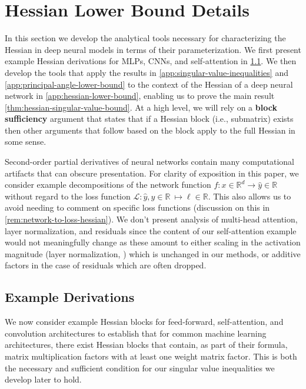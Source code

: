 \documentclass{article}
\theoremstyle{plain}
\theoremstyle{definition}
\theoremstyle{remark}
\begin{document}
\section{Hessian Lower Bound Details}
\label{app:hessian-lower-bound-details}

In this section we develop the analytical tools necessary for characterizing the Hessian in deep neural models in terms of their parameterization. We first present example Hessian derivations for MLPs, CNNs, and self-attention in \cref{app:example-hessian-derivations}. We then develop the tools that apply the results in \cref{app:singular-value-inequalities} and \cref{app:principal-angle-lower-bound} to the context of the Hessian of a deep neural network in \cref{app:hessian-lower-bound}, enabling us to prove the main result \cref{thm:hessian-singular-value-bound}. At a high level, we will rely on a \textbf{block sufficiency} argument that states that if a Hessian block (i.e., submatrix) exists then other arguments that follow based on the block apply to the full Hessian in some sense.

Second-order partial derivatives of neural networks contain many computational artifacts that can obscure presentation. For clarity of exposition in this paper, we consider example decompositions of the network function $f: x \in \mathbb{R}^d \to \hat{y} \in \mathbb{R}$ without regard to the loss function $\mathcal{L}: \hat{y}, y \in \mathbb{R} \ \mapsto \ell \in \mathbb{R}$. This also allows us to avoid needing to comment on specific loss functions (discussion on this in \cref{rem:network-to-loss-hessian}). We don't present analysis of multi-head attention, layer normalization, and residuals since the content of our self-attention example would not meaningfully change as these amount to either scaling in the activation magnitude (layer normalization, \citealp{xiong2020layer, xu2019understanding}) which is unchanged in our methods, or additive factors in the case of residuals which are often dropped.

\subsection{Example Derivations}
\label{app:example-hessian-derivations}

We now consider example Hessian blocks for feed-forward, self-attention, and convolution architectures to establish that for common machine learning architectures, there exist Hessian blocks that contain, as part of their formula, matrix multiplication factors with at least one weight matrix factor. This is both the necessary and sufficient condition for our singular value inequalities we develop later to hold.
\end{document}
